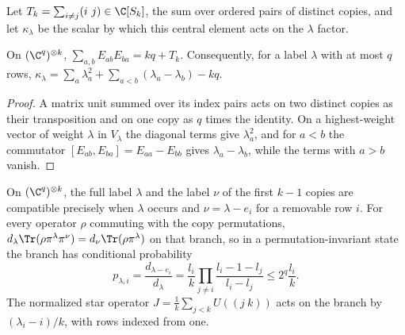 Let $T_k=\sum_{i\ne j}(i\ j)\in\C[S_k]$, the sum over ordered pairs of distinct copies,
and let $\kappa_\lambda$ be the scalar by which this central element acts on the
$\lambda$ factor.

\begin{lemma}
    \label{lem:casimir}
    \leanok
    On $(\C^q)^{\otimes k}$, $\sum_{a,b}E_{ab}E_{ba}=kq+T_k$. Consequently, for a
    label $\lambda$ with at most $q$ rows,
    $\kappa_\lambda=\sum_a\lambda_a^2+\sum_{a<b}(\lambda_a-\lambda_b)-kq$.
\end{lemma}

\begin{proof}\leanok
    A matrix unit summed over its index pairs acts on two distinct copies as their
    transposition and on one copy as $q$ times the identity. On a highest-weight
    vector of weight $\lambda$ in $V_\lambda$ the diagonal terms give $\lambda_a^2$,
    and for $a<b$ the commutator $[E_{ab},E_{ba}]=E_{aa}-E_{bb}$ gives
    $\lambda_a-\lambda_b$, while the terms with $a>b$ vanish.
\end{proof}

\begin{theorem}
    \label{thm:schur_part6}
    \leanok
    On $(\C^q)^{\otimes k}$, the full label $\lambda$ and the label $\nu$ of the first
    $k-1$ copies are compatible precisely when $\lambda$ occurs and
    $\nu=\lambda-e_i$ for a removable row $i$. For every operator $\rho$ commuting
    with the copy permutations, $d_\lambda\Tr(\rho\pi^\lambda\pi^\nu)=d_\nu
    \Tr(\rho\pi^\lambda)$ on that branch, so in a permutation-invariant state the
    branch has conditional probability
    \[
        p_{\lambda,i}=\frac{d_{\lambda-e_i}}{d_\lambda}
        =\frac{l_i}{k}\prod_{j\ne i}\frac{l_i-1-l_j}{l_i-l_j}\le2^q\frac{l_i}{k}.
    \]
    The normalized star operator $J=\frac1k\sum_{j<k}U((j\ k))$ acts on the branch by
    $(\lambda_i-i)/k$, with rows indexed from one.
\end{theorem}

